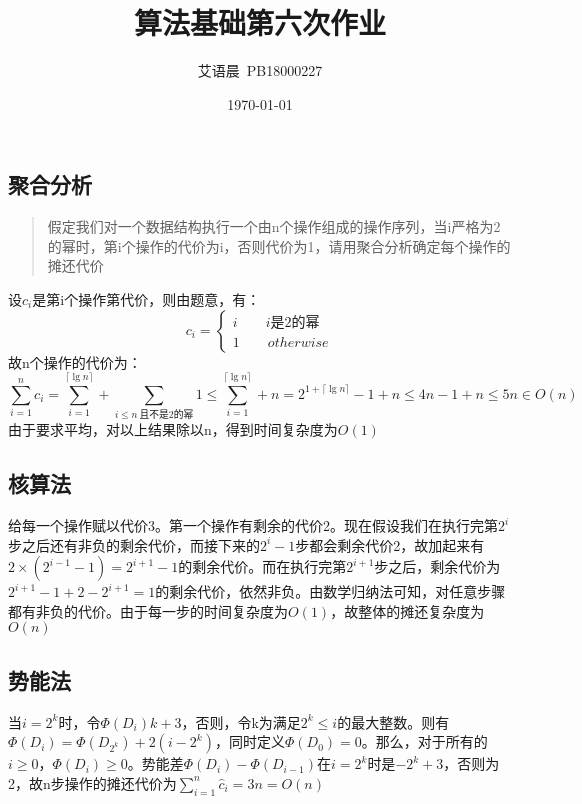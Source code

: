 \documentclass[]{report}
\title{算法基础第六次作业}
\author{艾语晨~PB18000227}
\date{\today}
\begin{document}
\theoremstyle{definition} \newtheorem{theorem}{Thm}[section] %
\theoremstyle{definition} \newtheorem{definition}{Def}[section] %
\theoremstyle{plain} \newtheorem{lemma}{lemma}[section] %

	\maketitle
	\newpage

	\tableofcontents
	\newpage

	\chapter{}
	\section{聚合分析}
	\begin{quote}
		假定我们对一个数据结构执行一个由n个操作组成的操作序列，当i严格为2的幂时，第i个操作的代价为i，否则代价为1，请用聚合分析确定每个操作的摊还代价
	\end{quote}
	设$c_i$是第i个操作第代价，则由题意，有：
	\[c_i=\begin{cases}
		i\qquad i\mbox{是2的幂}\\
		1\qquad otherwise
	\end{cases}\]
	故n个操作的代价为：
	\[\sum_{i=1}^nc_i=\sum_{i=1}^{\lceil\lg n\rceil}+\sum_{i\le n\ \mbox{且不是2的幂}}1\le\sum_{i=1}^{\lceil\lg n\rceil}+n=2^{1+\lceil\lg n\rceil}-1+n\le 4n-1+n\le 5n\in O(n)\]
	由于要求平均，对以上结果除以n，得到时间复杂度为$O(1)$
	\section{核算法}
	给每一个操作赋以代价3。第一个操作有剩余的代价2。现在假设我们在执行完第$2^i$步之后还有非负的剩余代价，而接下来的$2^i-1$步都会剩余代价2，故加起来有$2\times(2^{i-1}-1)=2^{i+1}-1$的剩余代价。而在执行完第$2^{i+1}$步之后，剩余代价为$2^{i+1}-1+2-2^{i+1}=1$的剩余代价，依然非负。由数学归纳法可知，对任意步骤都有非负的代价。由于每一步的时间复杂度为$O(1)$，故整体的摊还复杂度为$O(n)$
	\section{势能法}
	当$i=2^k$时，令$\Phi(D_i)k+3$，否则，令k为满足$2^k\le i$的最大整数。则有$\Phi(D_i)=\Phi(D_{2^k})+2(i-2^k)$，同时定义$\Phi(D_0)=0$。那么，对于所有的$i\ge0$，$\Phi(D_i)\ge0$。势能差$\Phi(D_i)-\Phi(D_{i-1})$在$i=2^k$时是$-2^k+3$，否则为2，故n步操作的摊还代价为$\sum_{i=1}^n\hat{c}_i=3n=O(n)$
\end{document}

